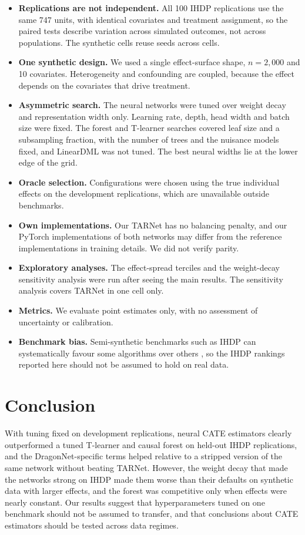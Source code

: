 \documentclass[10pt]{article}
\begin{document}
\begin{itemize}
  \item \textbf{Replications are not independent.} All 100 IHDP replications use the same 747 units, with identical covariates and treatment assignment, so the paired tests describe variation across simulated outcomes, not across populations. The synthetic cells reuse seeds across cells.
  \item \textbf{One synthetic design.} We used a single effect-surface shape, $n=2{,}000$ and 10 covariates. Heterogeneity and confounding are coupled, because the effect depends on the covariates that drive treatment.
  \item \textbf{Asymmetric search.} The neural networks were tuned over weight decay and representation width only. Learning rate, depth, head width and batch size were fixed. The forest and T-learner searches covered leaf size and a subsampling fraction, with the number of trees and the nuisance models fixed, and LinearDML was not tuned. The best neural widths lie at the lower edge of the grid.
  \item \textbf{Oracle selection.} Configurations were chosen using the true individual effects on the development replications, which are unavailable outside benchmarks.
  \item \textbf{Own implementations.} Our TARNet has no balancing penalty, and our PyTorch implementations of both networks may differ from the reference implementations in training details. We did not verify parity.
  \item \textbf{Exploratory analyses.} The effect-spread terciles and the weight-decay sensitivity analysis were run after seeing the main results. The sensitivity analysis covers TARNet in one cell only.
  \item \textbf{Metrics.} We evaluate point estimates only, with no assessment of uncertainty or calibration.
    \item \textbf{Benchmark bias.} Semi-synthetic benchmarks such as IHDP can systematically favour some algorithms over others \citep{curth2021really}, so the IHDP rankings reported here should not be assumed to hold on real data.
\end{itemize}

\section{Conclusion}

With tuning fixed on development replications, neural CATE estimators clearly outperformed a tuned T-learner and causal forest on held-out IHDP replications, and the DragonNet-specific terms helped relative to a stripped version of the same network without beating TARNet. However, the weight decay that made the networks strong on IHDP made them worse than their defaults on synthetic data with larger effects, and the forest was competitive only when effects were nearly constant. Our results suggest that hyperparameters tuned on one benchmark should not be assumed to transfer, and that conclusions about CATE estimators should be tested across data regimes.

\FloatBarrier


\end{document}
